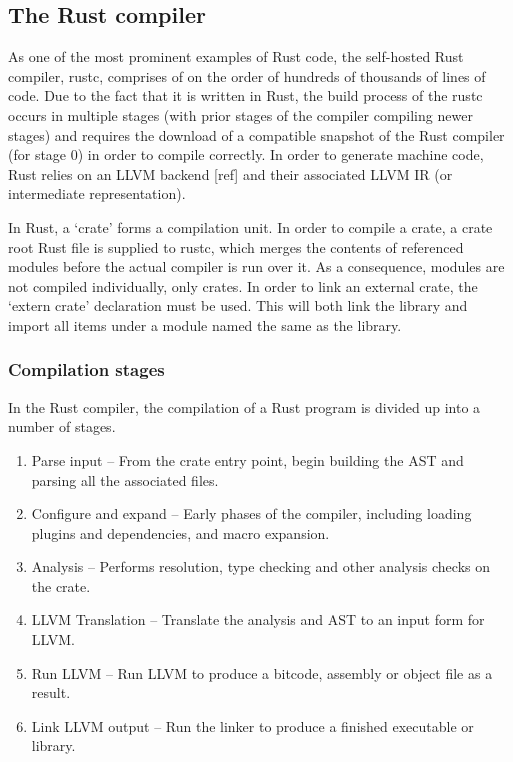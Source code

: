 
\subsection{The Rust compiler}
As one of the most prominent examples of Rust code, the self-hosted Rust compiler, rustc, comprises of on the order of hundreds of thousands of lines of code. Due to the fact that it is written in Rust, the build process of the rustc occurs in multiple stages (with prior stages of the compiler compiling newer stages) and requires the download of a compatible snapshot of the Rust compiler (for stage 0) in order to compile correctly. In order to generate machine code, Rust relies on an LLVM backend [ref] and their associated LLVM IR (or intermediate representation).

In Rust, a `crate' forms a compilation unit. In order to compile a crate, a crate root Rust file is supplied to rustc, which merges the contents of referenced modules before the actual compiler is run over it. As a consequence, modules are not compiled individually, only crates. In order to link an external crate, the `extern crate' declaration must be used. This will both link the library and import all items under a module named the same as the library. 

\subsubsection{Compilation stages}
In the Rust compiler, the compilation of a Rust program is divided up into a number of stages.

\begin{enumerate}
\item Parse input -- From the crate entry point, begin building the AST and parsing all the associated files.
\item Configure and expand -- Early phases of the compiler, including loading plugins and dependencies, and macro expansion.
\item Analysis -- Performs resolution, type checking and other analysis checks on the crate.
\item LLVM Translation -- Translate the analysis and AST to an input form for LLVM.
\item Run LLVM -- Run LLVM to produce a bitcode, assembly or object file as a result.
\item Link LLVM output -- Run the linker to produce a finished executable or library.
\end{enumerate}

